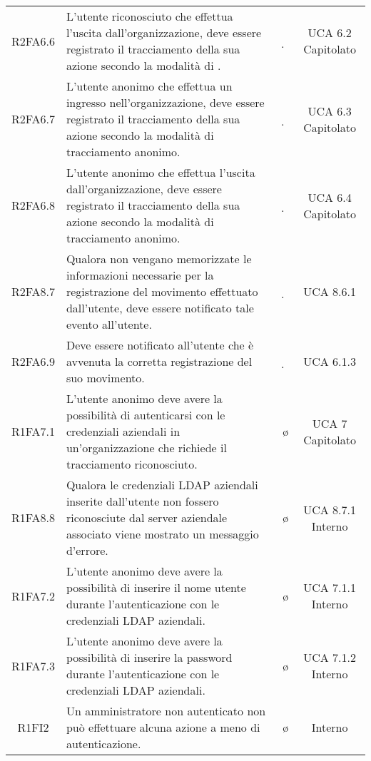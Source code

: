 {\begin{longtable}{ c C{6.5cm} c c}
R2FA6.6 & L’utente riconosciuto che effettua l’uscita dall’organizzazione, deve essere registrato il tracciamento della sua azione secondo la modalità di . & \d & UCA 6.2 Capitolato \\

R2FA6.7 & L’utente anonimo che effettua un ingresso nell’organizzazione, deve essere registrato il tracciamento della sua azione secondo la modalità di tracciamento anonimo. & \d & UCA 6.3 Capitolato \\

R2FA6.8 & L’utente anonimo che effettua l’uscita dall’organizzazione, deve essere registrato il tracciamento della sua azione secondo la modalità di tracciamento anonimo. & \d & UCA 6.4 Capitolato \\

R2FA8.7 & Qualora non vengano memorizzate le informazioni necessarie per la registrazione del movimento effettuato dall’utente, deve essere notificato tale evento all’utente. & \d & UCA 8.6.1 \\

R2FA6.9 & Deve essere notificato all’utente che è avvenuta la corretta registrazione del suo movimento. & \d & UCA 6.1.3 \\


R1FA7.1 & L'utente anonimo deve avere la possibilità di autenticarsi con le credenziali aziendali in un'organizzazione che richiede il tracciamento riconosciuto. & \o & UCA 7 Capitolato \\

R1FA8.8 & Qualora le credenziali LDAP aziendali inserite dall'utente non fossero riconosciute dal server aziendale associato viene mostrato un messaggio d'errore. & \o & UCA 8.7.1 Interno \\

R1FA7.2 & L'utente anonimo deve avere la possibilità di inserire il nome utente durante l'autenticazione con le credenziali LDAP aziendali. & \o & UCA 7.1.1 Interno \\

R1FA7.3 & L'utente anonimo deve avere la possibilità di inserire la password durante l'autenticazione con le credenziali LDAP aziendali. & \o & UCA 7.1.2 Interno \\

R1FI2 & Un amministratore non autenticato non può effettuare alcuna azione a meno di autenticazione. & \o & Interno \\


\end{longtable}}
